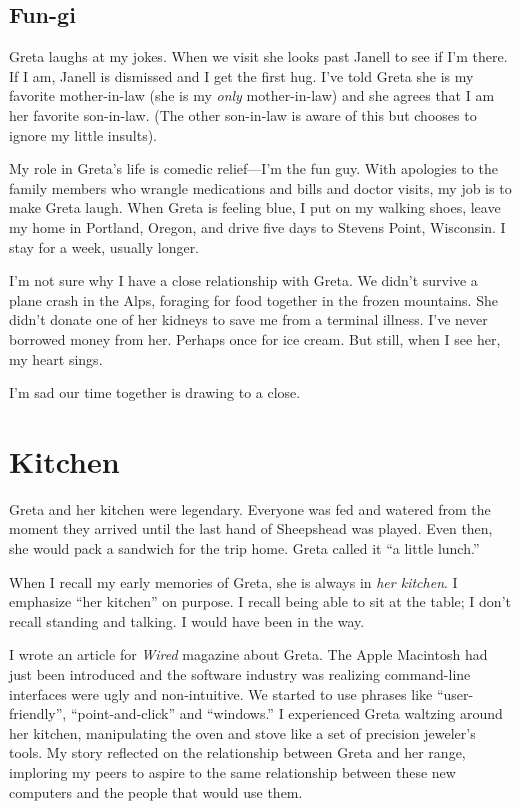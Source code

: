 \documentclass[
  letterpaper,
  DIV=11,
  numbers=noendperiod]{scrreprt}
\begin{document}
\section*{\texorpdfstring{\textbf{Fun-gi}}{Fun-gi}}\label{fun-gi}


Greta laughs at my jokes. When we visit she looks past Janell to see if
I'm there. If I am, Janell is dismissed and I get the first hug. I've
told Greta she is my favorite mother-in-law (she is my \emph{only}
mother-in-law) and she agrees that I am her favorite son-in-law. (The
other son-in-law is aware of this but chooses to ignore my little
insults).

My role in Greta's life is comedic relief---I'm the fun guy. With
apologies to the family members who wrangle medications and bills and
doctor visits, my job is to make Greta laugh. When Greta is feeling
blue, I put on my walking shoes, leave my home in Portland, Oregon, and
drive five days to Stevens Point, Wisconsin. I stay for a week, usually
longer.

I'm not sure why I have a close relationship with Greta. We didn't
survive a plane crash in the Alps, foraging for food together in the
frozen mountains. She didn't donate one of her kidneys to save me from a
terminal illness. I've never borrowed money from her. Perhaps once for
ice cream. But still, when I see her, my heart sings.

I'm sad our time together is drawing to a close.


\chapter*{Kitchen}\label{kitchen}


Greta and her kitchen were legendary. Everyone was fed and watered from
the moment they arrived until the last hand of Sheepshead was played.
Even then, she would pack a sandwich for the trip home. Greta called it
``a little lunch.''

When I recall my early memories of Greta, she is always in \emph{her
kitchen}. I emphasize ``her kitchen'' on purpose. I recall being able to
sit at the table; I don't recall standing and talking. I would have been
in the way.

I wrote an article for \emph{Wired} magazine about Greta. The Apple
Macintosh had just been introduced and the software industry was
realizing command-line interfaces were ugly and non-intuitive. We
started to use phrases like ``user-friendly'', ``point-and-click'' and
``windows.'' I experienced Greta waltzing around her kitchen,
manipulating the oven and stove like a set of precision jeweler's tools.
My story reflected on the relationship between Greta and her range,
imploring my peers to aspire to the same relationship between these new
computers and the people that would use them.
\end{document}

